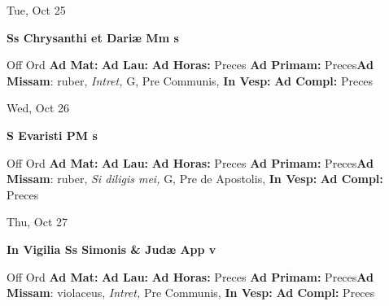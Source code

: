 \documentclass[10pt]{book}
\begin{document}
\begin{center}
\begin{minipage}{3.5in}
\vspace{2em}
\begin{center}Tue, Oct 25
\end{center}
\textbf{ \large Ss Chrysanthi et Dariæ Mm
\textnormal{\normalsize s}}

\begin{justify}Off Ord
\textbf{Ad Mat: }
\textbf{Ad Lau: }
\textbf{Ad Horas: }Preces
\textbf{Ad Primam: }Preces\textbf{Ad Missam}: ruber, \textit{Intret,} G, Pre Communis, 
\textbf{In Vesp: }
\textbf{Ad Compl: }Preces
\end{justify}
\end{minipage}
\end{center}

\begin{center}
\begin{minipage}{3.5in}
\vspace{2em}
\begin{center}Wed, Oct 26
\end{center}
\textbf{ \large S Evaristi PM
\textnormal{\normalsize s}}

\begin{justify}Off Ord
\textbf{Ad Mat: }
\textbf{Ad Lau: }
\textbf{Ad Horas: }Preces
\textbf{Ad Primam: }Preces\textbf{Ad Missam}: ruber, \textit{Si diligis mei,} G, Pre de Apostolis, 
\textbf{In Vesp: }
\textbf{Ad Compl: }Preces
\end{justify}
\end{minipage}
\end{center}

\begin{center}
\begin{minipage}{3.5in}
\vspace{2em}
\begin{center}Thu, Oct 27
\end{center}
\textbf{ \large In Vigilia Ss Simonis \& Judæ App
\textnormal{\normalsize v}}

\begin{justify}Off Ord
\textbf{Ad Mat: }
\textbf{Ad Lau: }
\textbf{Ad Horas: }Preces
\textbf{Ad Primam: }Preces\textbf{Ad Missam}: violaceus, \textit{Intret,} Pre Communis, 
\textbf{In Vesp: }
\textbf{Ad Compl: }Preces
\end{justify}
\end{minipage}
\end{center}
\end{document}
